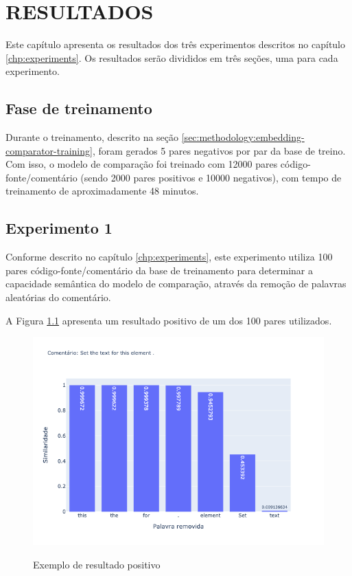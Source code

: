 \chapter{RESULTADOS}
\label{chp:results}

Este capítulo apresenta os resultados dos três experimentos descritos no capítulo \ref{chp:experiments}. Os resultados serão divididos em três seções, uma para cada experimento.

\section{Fase de treinamento}
Durante o treinamento, descrito na seção \ref{sec:methodology:embedding-comparator-training}, foram gerados 5 pares negativos por par da base de treino. Com isso, o modelo de comparação foi treinado com 12000 pares código-fonte/comentário (sendo 2000 pares positivos e 10000 negativos), com tempo de treinamento de aproximadamente 48 minutos.

\section{Experimento 1}
\label{sec:results:experiment-1}

Conforme descrito no capítulo \ref{chp:experiments}, este experimento utiliza 100 pares código-fonte/comentário da base de treinamento para determinar a capacidade semântica do modelo de comparação, através da remoção de palavras aleatórias do comentário.

A Figura \ref{fig:experiment-1:good} apresenta um resultado positivo de um dos 100 pares utilizados.
\begin{figure}[H]
  \centering
    \caption{Exemplo de resultado positivo}
    \includegraphics[scale=0.6]{imagens/resultados/experiment-1/sample_5.png}
    \label{fig:experiment-1:good}
\end{figure}

